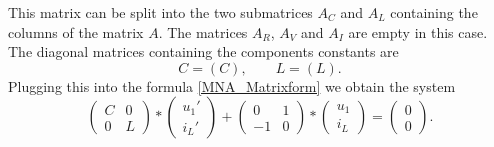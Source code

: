  This matrix can be split into the two submatrices $A_C$ and $A_L$ containing the columns of the matrix $A$. The matrices $A_R$, $A_V$ and $A_I$ are empty in this case. The diagonal matrices containing the components constants are
\begin{displaymath}
	C = (C), \qquad L = (L).
\end{displaymath}
Plugging this into the formula \eqref{MNA_Matrixform} we obtain the system
\begin{displaymath}
	\begin{pmatrix}
		C & 0 \\
		0 & L 
	\end{pmatrix}
	*
	\begin{pmatrix}
		u_1' \\
		i_L'
	\end{pmatrix}
	+
	\begin{pmatrix}
		0 & 1 \\
		-1 & 0
	\end{pmatrix}
	*
	\begin{pmatrix}
		u_1 \\
		i_L
	\end{pmatrix}
	=
	\begin{pmatrix}
		0 \\
		0 
	\end{pmatrix}.
\end{displaymath}


